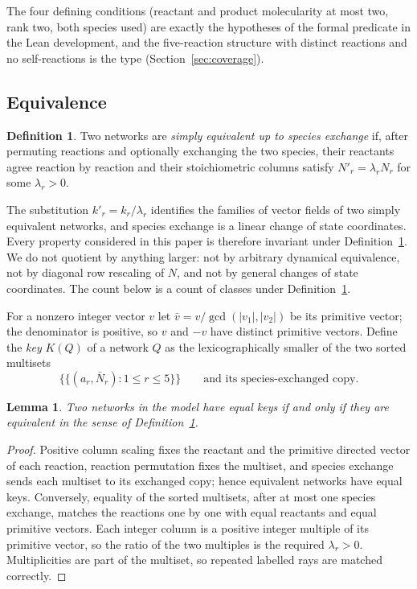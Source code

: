 \documentclass[11pt,a4paper]{article}
\theoremstyle{plain}
\newtheorem{lemma}[theorem]{Lemma}
\theoremstyle{definition}
\newtheorem{definition}[theorem]{Definition}
\theoremstyle{remark}
\numberwithin{equation}{section}
\begin{document}
The four defining conditions (reactant and product molecularity at most two, rank two, both species used) are exactly the hypotheses of the formal predicate  in the Lean development, and the five-reaction structure with distinct reactions and no self-reactions is the type  (Section~\ref{sec:coverage}).

\subsection{Equivalence}
\begin{definition}\label{def:equiv}
Two networks are \emph{simply equivalent up to species exchange} if, after permuting reactions and optionally exchanging the two species, their reactants agree reaction by reaction and their stoichiometric columns satisfy $N'_r=\lambda_rN_r$ for some $\lambda_r>0$.
\end{definition}

The substitution $k'_r=k_r/\lambda_r$ identifies the families of vector fields of two simply equivalent networks, and species exchange is a linear change of state coordinates. Every property considered in this paper is therefore invariant under Definition~\ref{def:equiv}. We do not quotient by anything larger: not by arbitrary dynamical equivalence, not by diagonal row rescaling of $N$, and not by general changes of state coordinates. The count below is a count of classes under Definition~\ref{def:equiv}.

For a nonzero integer vector $v$ let $\bar v=v/\gcd(|v_1|,|v_2|)$ be its primitive vector; the denominator is positive, so $v$ and $-v$ have distinct primitive vectors. Define the \emph{key} $K(Q)$ of a network $Q$ as the lexicographically smaller of the two sorted multisets
\begin{equation}\label{eq:key}
 \{\!\{(a_r,\bar N_r):1\le r\le5\}\!\}\qquad\text{and its species-exchanged copy.}
\end{equation}

\begin{lemma}\label{lem:key}
Two networks in the model have equal keys if and only if they are equivalent in the sense of Definition~\ref{def:equiv}.
\end{lemma}
\begin{proof}
Positive column scaling fixes the reactant and the primitive directed vector of each reaction, reaction permutation fixes the multiset, and species exchange sends each multiset to its exchanged copy; hence equivalent networks have equal keys. Conversely, equality of the sorted multisets, after at most one species exchange, matches the reactions one by one with equal reactants and equal primitive vectors. Each integer column is a positive integer multiple of its primitive vector, so the ratio of the two multiples is the required $\lambda_r>0$. Multiplicities are part of the multiset, so repeated labelled rays are matched correctly.
\end{proof}
\end{document}
